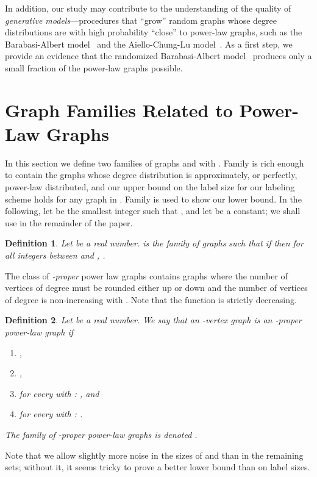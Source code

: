 \documentclass{article}
\newtheorem{definition}{Definition}
\theoremstyle{remark}
\begin{document}
In addition, our study  may contribute to  the understanding of the quality of  \emph{generative models}---procedures that ``grow'' random graphs whose degree distributions are with high probability ``close'' to power-law graphs,  such as the Barabasi-Albert model~\cite{barabasi1999emergence} and the   Aiello-Chung-Lu model~\cite{aiello2001random}. As a first step, we provide an evidence  that the randomized Barabasi-Albert model~\cite{barabasi1999emergence} produces only a small fraction of the power-law graphs possible.
 \section{Graph Families Related to Power-Law Graphs}\label{Sec:GraphFamilies}
In this section we define two families of graphs  and  with . Family  is rich enough to contain the graphs whose degree distribution is approximately, or perfectly, power-law distributed, and our upper bound on the label size for our labeling scheme holds for any graph in . Family  is used to show our lower bound. In the following, let  be the smallest integer such that , and let  be a constant; we shall use  in the remainder of the paper.
\begin{definition} \label{def:general-family}
Let  be a real number.  is the family of graphs  such that if  then for all integers  between  and , .
\end{definition}

The class of \emph{-proper} power law graphs contains graphs where  the number of vertices of degree 
must be  rounded either up or down and the number of vertices of degree  is non-increasing
with . Note that the function  is strictly decreasing.
 
\begin{definition}\label{def:proper}
Let  be a real number. We say that an -vertex graph   is an  -\emph{proper power-law graph} 
if
\begin{enumerate}
\item ,
\item ,
\item for every  with :  , and
\item for every  with : .
\end{enumerate}
The family of -proper power-law graphs is denoted .
\end{definition}
Note that we allow slightly more noise in the sizes of  and  than in the remaining sets; without it, it seems tricky to prove a better lower bound than  on label sizes.
\end{document}
